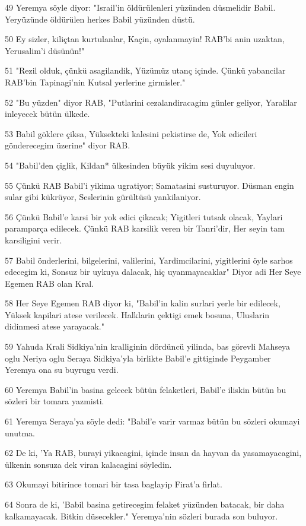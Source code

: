 \par 49 Yeremya söyle diyor: "Israil'in öldürülenleri yüzünden düsmelidir Babil. Yeryüzünde öldürülen herkes Babil yüzünden düstü.
\par 50 Ey sizler, kiliçtan kurtulanlar, Kaçin, oyalanmayin! RAB'bi anin uzaktan, Yerusalim'i düsünün!"
\par 51 "Rezil olduk, çünkü asagilandik, Yüzümüz utanç içinde. Çünkü yabancilar RAB'bin Tapinagi'nin Kutsal yerlerine girmisler."
\par 52 "Bu yüzden" diyor RAB, "Putlarini cezalandiracagim günler geliyor, Yaralilar inleyecek bütün ülkede.
\par 53 Babil göklere çiksa, Yüksekteki kalesini pekistirse de, Yok edicileri gönderecegim üzerine" diyor RAB.
\par 54 "Babil'den çiglik, Kildan* ülkesinden büyük yikim sesi duyuluyor.
\par 55 Çünkü RAB Babil'i yikima ugratiyor; Samatasini susturuyor. Düsman engin sular gibi kükrüyor, Seslerinin gürültüsü yankilaniyor.
\par 56 Çünkü Babil'e karsi bir yok edici çikacak; Yigitleri tutsak olacak, Yaylari paramparça edilecek. Çünkü RAB karsilik veren bir Tanri'dir, Her seyin tam karsiligini verir.
\par 57 Babil önderlerini, bilgelerini, valilerini, Yardimcilarini, yigitlerini öyle sarhos edecegim ki, Sonsuz bir uykuya dalacak, hiç uyanmayacaklar" Diyor adi Her Seye Egemen RAB olan Kral.
\par 58 Her Seye Egemen RAB diyor ki, "Babil'in kalin surlari yerle bir edilecek, Yüksek kapilari atese verilecek. Halklarin çektigi emek bosuna, Uluslarin didinmesi atese yarayacak."
\par 59 Yahuda Krali Sidkiya'nin kralliginin dördüncü yilinda, bas görevli Mahseya oglu Neriya oglu Seraya Sidkiya'yla birlikte Babil'e gittiginde Peygamber Yeremya ona su buyrugu verdi.
\par 60 Yeremya Babil'in basina gelecek bütün felaketleri, Babil'e iliskin bütün bu sözleri bir tomara yazmisti.
\par 61 Yeremya Seraya'ya söyle dedi: "Babil'e varir varmaz bütün bu sözleri okumayi unutma.
\par 62 De ki, 'Ya RAB, burayi yikacagini, içinde insan da hayvan da yasamayacagini, ülkenin sonsuza dek viran kalacagini söyledin.
\par 63 Okumayi bitirince tomari bir tasa baglayip Firat'a firlat.
\par 64 Sonra de ki, 'Babil basina getirecegim felaket yüzünden batacak, bir daha kalkamayacak. Bitkin düsecekler." Yeremya'nin sözleri burada son buluyor.

